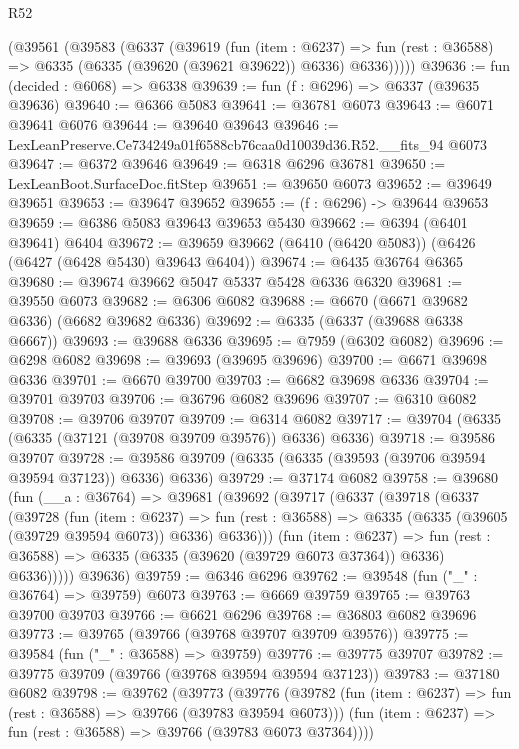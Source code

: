 \begin{lexlean}{R52}
\begin{coremodule}
    (@39561
      (@39583
        (@6337
          (@39619
            (fun (item : @6237) =>
            fun (rest : @36588) => @6335 (@6335 (@39620 (@39621 @39622)) @6336) @6336)))))
@39636 := fun (decided : @6068) => @6338
@39639 := fun (f : @6296) => @6337 (@39635 @39636)
@39640 := @6366 @5083
@39641 := @36781 @6073
@39643 := @6071 @39641 @6076
@39644 := @39640 @39643
@39646 := LexLeanPreserve.Ce734249a01f6588cb76caa0d10039d36.R52.__fits_94 @6073
@39647 := @6372 @39646
@39649 := @6318 @6296 @36781
@39650 := LexLeanBoot.SurfaceDoc.fitStep
@39651 := @39650 @6073
@39652 := @39649 @39651
@39653 := @39647 @39652
@39655 := (f : @6296) -> @39644 @39653
@39659 := @6386 @5083 @39643 @39653 @5430
@39662 := @6394 (@6401 @39641) @6404
@39672 := @39659 @39662 (@6410 (@6420 @5083)) (@6426 (@6427 (@6428 @5430) @39643 @6404))
@39674 := @6435 @36764 @6365
@39680 := @39674 @39662 @5047 @5337 @5428 @6336 @6320
@39681 := @39550 @6073
@39682 := @6306 @6082
@39688 := @6670 (@6671 @39682 @6336) (@6682 @39682 @6336)
@39692 := @6335 (@6337 (@39688 @6338 @6667))
@39693 := @39688 @6336
@39695 := @7959 (@6302 @6082)
@39696 := @6298 @6082
@39698 := @39693 (@39695 @39696)
@39700 := @6671 @39698 @6336
@39701 := @6670 @39700
@39703 := @6682 @39698 @6336
@39704 := @39701 @39703
@39706 := @36796 @6082 @39696
@39707 := @6310 @6082
@39708 := @39706 @39707
@39709 := @6314 @6082
@39717 := @39704 (@6335 (@6335 (@37121 (@39708 @39709 @39576)) @6336) @6336)
@39718 := @39586 @39707
@39728 := @39586 @39709 (@6335 (@6335 (@39593 (@39706 @39594 @39594 @37123)) @6336) @6336)
@39729 := @37174 @6082
@39758 := @39680
    (fun (__a : @36764) =>
    @39681
      (@39692
        (@39717
          (@6337
            (@39718
              (@6337
                (@39728
                  (fun (item : @6237) =>
                  fun (rest : @36588) => @6335 (@6335 (@39605 (@39729 @39594 @6073)) @6336) @6336)))
              (fun (item : @6237) =>
              fun (rest : @36588) => @6335 (@6335 (@39620 (@39729 @6073 @37364)) @6336) @6336)))))
      @39636)
@39759 := @6346 @6296
@39762 := @39548 (fun ("_" : @36764) => @39759) @6073
@39763 := @6669 @39759
@39765 := @39763 @39700 @39703
@39766 := @6621 @6296
@39768 := @36803 @6082 @39696
@39773 := @39765 (@39766 (@39768 @39707 @39709 @39576))
@39775 := @39584 (fun ("_" : @36588) => @39759)
@39776 := @39775 @39707
@39782 := @39775 @39709 (@39766 (@39768 @39594 @39594 @37123))
@39783 := @37180 @6082
@39798 := @39762
    (@39773
      (@39776
        (@39782 (fun (item : @6237) => fun (rest : @36588) => @39766 (@39783 @39594 @6073)))
        (fun (item : @6237) => fun (rest : @36588) => @39766 (@39783 @6073 @37364))))

\end{coremodule}
\end{lexlean}

